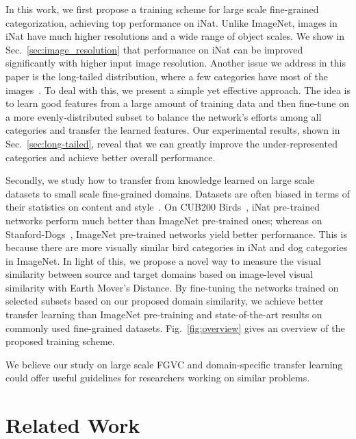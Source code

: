 \documentclass[10pt,twocolumn,letterpaper]{article}
\begin{document}
In this work, we first propose a training scheme for large scale fine-grained categorization, achieving top performance on iNat.
Unlike ImageNet, images in iNat have much higher resolutions and a wide range of object scales.
We show in Sec.\ \ref{sec:image_resolution} that performance on iNat can be improved significantly with higher input image resolution.
Another issue we address in this paper is the long-tailed distribution, where a few categories have most of the images~\cite{long-tail_object, van2017devil}.
To deal with this, we present a simple yet effective approach.
The idea is to learn good features from a large amount of training data and then fine-tune on a more evenly-distributed subset to balance the network's efforts among all categories and transfer the learned features.
Our experimental results, shown in Sec.\ \ref{sec:long-tailed}, reveal that we can greatly improve the under-represented categories and achieve better overall performance.

Secondly, we study how to transfer from knowledge learned on large scale datasets to small scale fine-grained domains.
Datasets are often biased in terms of their statistics on content and style~\cite{torralba2011unbiased}.
On CUB200 Birds~\cite{cub200}, iNat pre-trained networks perform much better than ImageNet pre-trained ones; whereas on Stanford-Dogs~\cite{stanford_dog}, ImageNet pre-trained networks yield better performance.
This is because there are more visually similar bird categories in iNat and dog categories in ImageNet.
In light of this, we propose a novel way to measure the visual similarity between source and target domains based on image-level visual similarity with Earth Mover's Distance.
By fine-tuning the networks trained on selected subsets based on our proposed domain similarity, we achieve better transfer learning than ImageNet pre-training and state-of-the-art results on commonly used fine-grained datasets.
Fig.\ \ref{fig:overview} gives an overview of the proposed training scheme.

We believe our study on large scale FGVC and domain-specific transfer learning could offer useful guidelines for researchers working on similar problems.





\section{Related Work}
\end{document}
